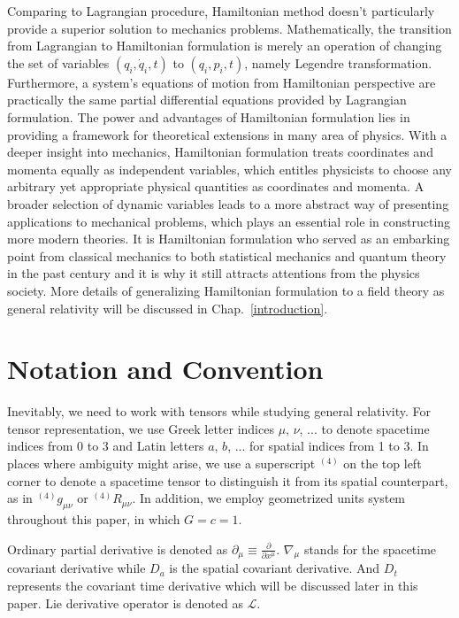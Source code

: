 Comparing to Lagrangian procedure, Hamiltonian method doesn't particularly provide a superior solution to mechanics problems. Mathematically, the transition from Lagrangian to Hamiltonian formulation is merely an operation of changing the set of variables $(q_{i}, {\dot q}_{i}, t)$ to $(q_{i}, p_{i}, t)$, namely Legendre transformation. Furthermore, a system's equations of motion from Hamiltonian perspective are practically the same partial differential equations provided by Lagrangian formulation. The power and advantages of Hamiltonian formulation lies in providing a framework for theoretical extensions in many area of physics. With a deeper insight into mechanics, Hamiltonian formulation treats coordinates and momenta equally as independent variables, which entitles physicists to choose any arbitrary yet appropriate physical quantities as coordinates and momenta. A broader selection of dynamic variables leads to a more abstract way of presenting applications to mechanical problems, which plays an essential role in constructing more modern theories. It is Hamiltonian formulation who served as an embarking point from classical mechanics to both statistical mechanics and quantum theory in the past century and it is why it still attracts attentions from the physics society\cite{goldstein}. More details of generalizing Hamiltonian formulation to a field theory as general relativity will be discussed in Chap.~\ref{introduction}. 

\section{Notation and Convention}\label{notation} Inevitably, we need to work with tensors while studying general relativity. For tensor representation, we use Greek letter indices $\mu$, $\nu$, ... to denote spacetime indices from 0 to 3 and Latin letters $a$, $b$, ... for spatial indices from 1 to 3. In places where ambiguity might arise, we use a superscript $^{(4)}$ on the top left corner to denote a spacetime tensor to distinguish it from its spatial counterpart, as in $^{(4)}g_{\mu\nu}$ or $^{(4)}R_{\mu\nu}$. In addition, we employ geometrized  units system throughout this paper, in which $G = c = 1$.

Ordinary partial derivative is denoted as $
\partial_{\mu} \equiv \frac{
\partial}{
\partial x^{\mu}}$. $\nabla_{\mu}$ stands for the spacetime covariant derivative while $D_{a}$ is the spatial covariant derivative. And $D_{t}$ represents the covariant time derivative which will be discussed later in this paper. Lie derivative operator is denoted as $\mathcal{L}$. 

